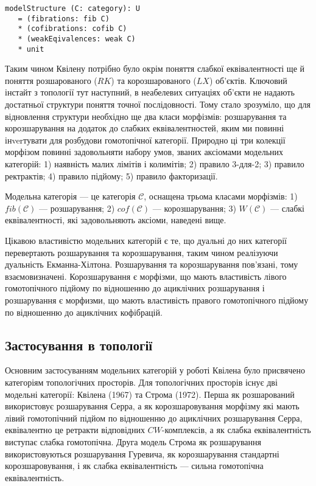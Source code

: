 \documentclass{article}
\begin{document}
\begin{lstlisting}
modelStructure (C: category): U
   = (fibrations: fib C)
   * (cofibrations: cofib C)
   * (weakEqivalences: weak C)
   * unit
\end{lstlisting}

Таким чином Квілену потрібно було окрім поняття слабкої еквівалентності ще й поняття розшарованого ($RK$) та корозшарованого ($LX$) об'єктів. Ключовий інстайт з топології тут наступний, в неабелевих ситуаціях об'єкти не надають достатньої структури поняття точної послідовності. Тому стало зрозуміло, що для відновлення структури необхідно ще два класи морфізмів: розшарування та корозшарування на додаток до слабких еквівалентностей, яким ми повинні інverтувати для розбудови гомотопічної категорії. Природно ці три колекції морфізом повинні задовольняти набору умов, званих аксіомами модельних категорій: 1) наявність малих лімітів і колимітів; 2) правило 3-для-2; 3) правило ректрактів; 4) правило підйому; 5) правило факторизації.

\begin{definition}
Модельна категорія --- це категорія $\mathcal{C}$, оснащена трьома класами морфізмів: 1) $fib(\mathcal{C})$ --- розшарування; 2) $cof(\mathcal{C})$ --- корозшарування; 3) $W(\mathcal{C})$ --- слабкі еквівалентності, які задовольняють аксіоми, наведені вище.
\end{definition}

Цікавою властивістю модельних категорій є те, що дуальні до них категорії перевертають розшарування та корозшарування, таким чином реалізуючи дуальність Екманна-Хілтона. Розшарування та корозшарування пов'язані, тому взаємовизначені. Корозшарування є морфізми, що мають властивість лівого гомотопічного підйому по відношенню до ациклічних розшарування і розшарування є морфизми, що мають властивість правого гомотопічного підйому по відношенню до ациклічних кофібрацій.

\subsection{Застосування в топології}
Основним застосуванням модельних категорій у роботі Квілена було присвячено категоріям топологічних просторів. Для топологічних просторів існує дві модельні категорії: Квілена (1967) та Строма (1972). Перша як розшарований використовує розшарування Серра, а як корозшаровування морфізму які мають лівий гомотопічний підйом по відношенню до ациклічних розшарування Серра, еквівалентно це ретракти відповідних $CW$-комплексів, а як слабка еквівалентність виступає слабка гомотопічна. Друга модель Строма як розшарування використовуються розшарування Гуревича, як корозшарування стандартні корозшаровування, і як слабка еквівалентність --- сильна гомотопічна еквівалентність.
\end{document}
